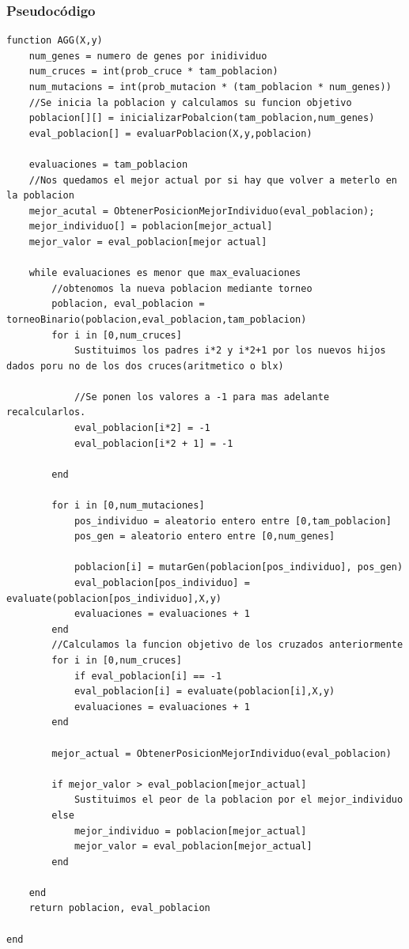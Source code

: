 \documentclass[titlepage]{article}
\begin{document}
	\subsubsection{Pseudocódigo}
	\begin{lstlisting}
function AGG(X,y)
	num_genes = numero de genes por inidividuo
	num_cruces = int(prob_cruce * tam_poblacion)
	num_mutacions = int(prob_mutacion * (tam_poblacion * num_genes))	
	//Se inicia la poblacion y calculamos su funcion objetivo
	poblacion[][] = inicializarPobalcion(tam_poblacion,num_genes)
	eval_poblacion[] = evaluarPoblacion(X,y,poblacion)
	
	evaluaciones = tam_poblacion
	//Nos quedamos el mejor actual por si hay que volver a meterlo en la poblacion
	mejor_acutal = ObtenerPosicionMejorIndividuo(eval_poblacion);
	mejor_individuo[] = poblacion[mejor_actual]
	mejor_valor = eval_poblacion[mejor actual]
	
	while evaluaciones es menor que max_evaluaciones		
		//obtenomos la nueva poblacion mediante torneo
		poblacion, eval_poblacion = torneoBinario(poblacion,eval_poblacion,tam_poblacion)
		for i in [0,num_cruces]
			Sustituimos los padres i*2 y i*2+1 por los nuevos hijos dados poru no de los dos cruces(aritmetico o blx)
			
			//Se ponen los valores a -1 para mas adelante recalcularlos.
			eval_poblacion[i*2] = -1
			eval_poblacion[i*2 + 1] = -1
			
		end
		
		for i in [0,num_mutaciones]
			pos_individuo = aleatorio entero entre [0,tam_poblacion] 
			pos_gen = aleatorio entero entre [0,num_genes] 
			
			poblacion[i] = mutarGen(poblacion[pos_individuo], pos_gen)
			eval_poblacion[pos_individuo] = evaluate(poblacion[pos_individuo],X,y)
			evaluaciones = evaluaciones + 1			
		end		
		//Calculamos la funcion objetivo de los cruzados anteriormente
		for i in [0,num_cruces]
			if eval_poblacion[i] == -1
			eval_poblacion[i] = evaluate(poblacion[i],X,y)
			evaluaciones = evaluaciones + 1		
		end
		
		mejor_actual = ObtenerPosicionMejorIndividuo(eval_poblacion)
		
		if mejor_valor > eval_poblacion[mejor_actual]
			Sustituimos el peor de la poblacion por el mejor_individuo
		else
			mejor_individuo = poblacion[mejor_actual]
			mejor_valor = eval_poblacion[mejor_actual]
		end
		
	end
	return poblacion, eval_poblacion

end
	\end{lstlisting}
	
\end{document}
